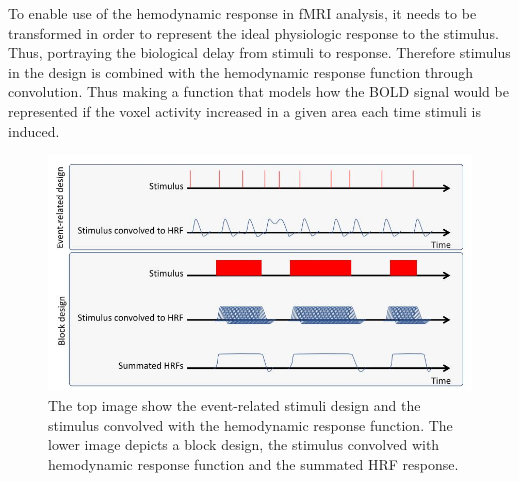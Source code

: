 To enable use of the hemodynamic response in fMRI analysis, it needs to be transformed in order to represent the ideal physiologic response to the stimulus. Thus, portraying the biological delay from stimuli to response. Therefore stimulus in the design is combined with the hemodynamic response function through convolution. Thus making a function that models how the BOLD signal would be represented if the voxel activity increased in a given area each time stimuli is induced. \cite{Moayedi2018}

\begin{figure}[H]                 
	\includegraphics[width=.8\textwidth]{figures/aBackground/event_vs_block}  
	\caption{The top image show the event-related stimuli design and the stimulus convolved with the hemodynamic response function. The lower image depicts a block design, the stimulus convolved with hemodynamic response function and the summated HRF response.  \cite{Moayedi2018}}
	\label{fig:back:e_vs_b} 
\end{figure}

 

